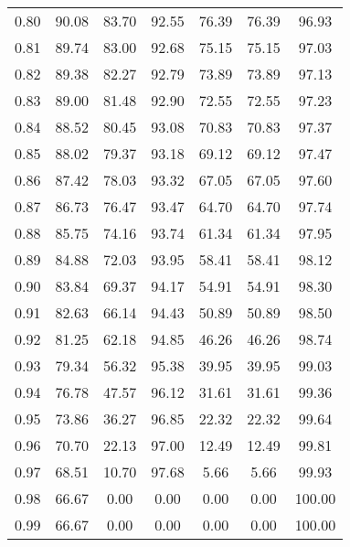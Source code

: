 \begin{tabular}{|c|c|c|c|c|c|c|}
      0.80 &     90.08 &     83.70 &      92.55 &   76.39 &      76.39 &         96.93 \\
      0.81 &     89.74 &     83.00 &      92.68 &   75.15 &      75.15 &         97.03 \\
      0.82 &     89.38 &     82.27 &      92.79 &   73.89 &      73.89 &         97.13 \\
      0.83 &     89.00 &     81.48 &      92.90 &   72.55 &      72.55 &         97.23 \\
      0.84 &     88.52 &     80.45 &      93.08 &   70.83 &      70.83 &         97.37 \\
      0.85 &     88.02 &     79.37 &      93.18 &   69.12 &      69.12 &         97.47 \\
      0.86 &     87.42 &     78.03 &      93.32 &   67.05 &      67.05 &         97.60 \\
      0.87 &     86.73 &     76.47 &      93.47 &   64.70 &      64.70 &         97.74 \\
      0.88 &     85.75 &     74.16 &      93.74 &   61.34 &      61.34 &         97.95 \\
      0.89 &     84.88 &     72.03 &      93.95 &   58.41 &      58.41 &         98.12 \\
      0.90 &     83.84 &     69.37 &      94.17 &   54.91 &      54.91 &         98.30 \\
      0.91 &     82.63 &     66.14 &      94.43 &   50.89 &      50.89 &         98.50 \\
      0.92 &     81.25 &     62.18 &      94.85 &   46.26 &      46.26 &         98.74 \\
      0.93 &     79.34 &     56.32 &      95.38 &   39.95 &      39.95 &         99.03 \\
      0.94 &     76.78 &     47.57 &      96.12 &   31.61 &      31.61 &         99.36 \\
      0.95 &     73.86 &     36.27 &      96.85 &   22.32 &      22.32 &         99.64 \\
      0.96 &     70.70 &     22.13 &      97.00 &   12.49 &      12.49 &         99.81 \\
      0.97 &     68.51 &     10.70 &      97.68 &    5.66 &       5.66 &         99.93 \\
      0.98 &     66.67 &      0.00 &       0.00 &    0.00 &       0.00 &        100.00 \\
      0.99 &     66.67 &      0.00 &       0.00 &    0.00 &       0.00 &        100.00 \\
\bottomrule
\end{tabular}
